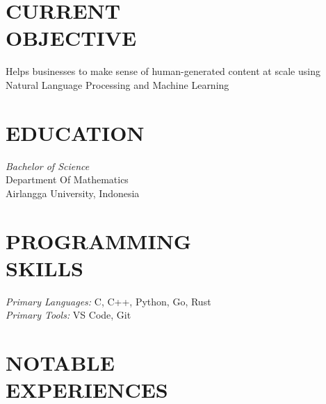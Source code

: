 \documentclass[margin, 10pt]{res} %
\begin{document}
\begin{resume}

 \section{CURRENT\\OBJECTIVE}

Helps businesses to make sense of human-generated content at scale using Natural Language Processing
and Machine Learning


\section{EDUCATION}

{\sl Bachelor of Science} \\
Department Of Mathematics \\
Airlangga University, Indonesia


\section{PROGRAMMING\\ SKILLS}

{\sl Primary Languages:} C, C++, Python, Go, Rust \\
{\sl Primary Tools:} VS Code, Git


\section{NOTABLE\\EXPERIENCES}


\end{resume}
\end{document}
